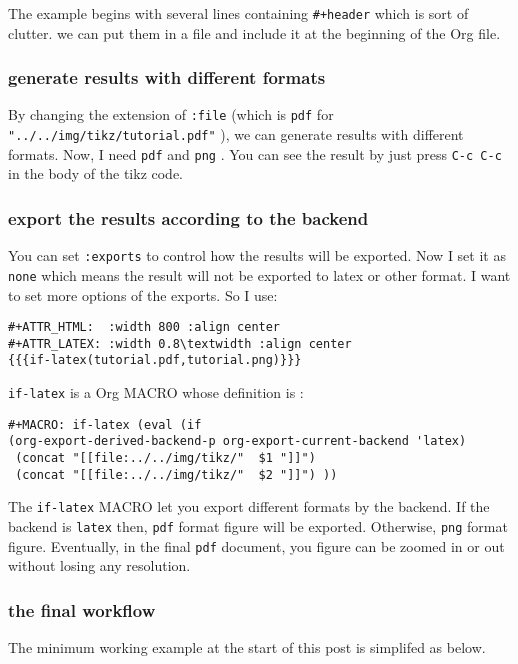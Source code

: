 The example begins with several lines containing \texttt{\#+header} which is sort of
clutter. we can put them in a file and include it at the beginning of the Org
file.
\subsubsection{generate results with different formats}
\label{sec:orgebb7e4e}


By changing the extension of \texttt{:file} (which is \texttt{pdf} for
\texttt{"../../img/tikz/tutorial.pdf"} ), we can generate results with different formats.
Now, I need \texttt{pdf} and \texttt{png} . You can see the result by just press \texttt{C-c C-c} in the
body of the tikz code.
\subsubsection{export the results according to the backend}
\label{sec:org3858655}


You can set \texttt{:exports} to control how the results will be exported. Now I set it
as \texttt{none} which means the result will not be exported to latex or other format. I
want to set more options of the exports. So I use:

\begin{verbatim}
#+ATTR_HTML:  :width 800 :align center
#+ATTR_LATEX: :width 0.8\textwidth :align center
{{{if-latex(tutorial.pdf,tutorial.png)}}}
\end{verbatim}

\texttt{if-latex} is a Org MACRO whose definition is :
\begin{verbatim}
#+MACRO: if-latex (eval (if
(org-export-derived-backend-p org-export-current-backend 'latex)
 (concat "[[file:../../img/tikz/"  $1 "]]")
 (concat "[[file:../../img/tikz/"  $2 "]]") ))
\end{verbatim}

The \texttt{if-latex} MACRO let you export different formats by the backend. If the
backend is \texttt{latex} then, \texttt{pdf} format figure will be exported. Otherwise, \texttt{png} format
figure. Eventually, in the final \texttt{pdf} document, you figure can be zoomed in or
out without losing any resolution.

\subsubsection{the final workflow}
\label{sec:org2af511e}


The minimum working example at the start of this post is simplifed as below.

